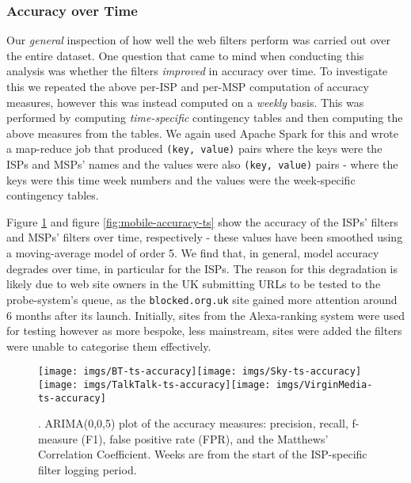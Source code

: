 \documentclass{bmcart}
\begin{document}


\subsubsection*{Accuracy over Time}
Our \textit{general} inspection of how well the web filters perform was carried out over the entire dataset.
One question that came to mind when conducting this analysis was whether the filters \textit{improved} in accuracy over time.
To investigate this we repeated the above per-ISP and per-MSP computation of accuracy measures, however this was instead computed on a \textit{weekly} basis.
This was performed by computing \textit{time-specific} contingency tables and then computing the above measures from the tables.
We again used Apache Spark for this and wrote a map-reduce job that produced \texttt{(key, value)} pairs where the keys were the ISPs and MSPs' names and the values were also \texttt{(key, value)} pairs - where the keys were this time week numbers and the values were the week-specific contingency tables.

Figure \ref{fig:broadband-accuracy-ts} and figure \ref{fig:mobile-accuracy-ts} show the accuracy of the ISPs' filters and MSPs' filters over time, respectively - these values have been smoothed using a moving-average model of order 5.
We find that, in general, model accuracy degrades over time, in particular for the ISPs.
The reason for this degradation is likely due to web site owners in the UK submitting URLs to be tested to the probe-system's queue, as the \texttt{blocked.org.uk} site gained more attention around 6 months after its launch.
Initially, sites from the Alexa-ranking system were used for testing however as more bespoke, less mainstream, sites were added the filters were unable to categorise them effectively.

\begin{figure}[h!]
\caption{. ARIMA(0,0,5) plot of the accuracy measures: precision, recall, f-measure (F1), false positive rate (FPR), and the Matthews' Correlation Coefficient. Weeks are from the start of the ISP-specific filter logging period.}
\texttt{[image: imgs/BT-ts-accuracy]}\texttt{[image: imgs/Sky-ts-accuracy]}
\texttt{[image: imgs/TalkTalk-ts-accuracy]}\texttt{[image: imgs/VirginMedia-ts-accuracy]}
\label{fig:broadband-accuracy-ts}
\end{figure}
\end{document}
